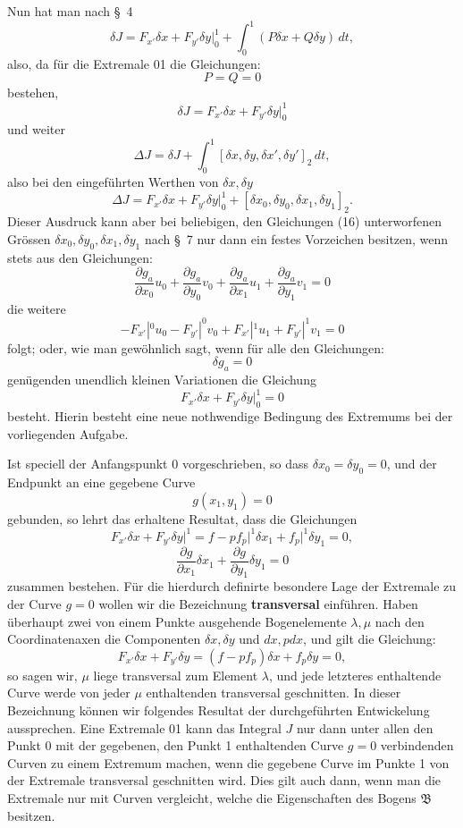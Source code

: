 \documentclass[11pt,a4paper,leqno]{article}
\begin{document}
Nun hat man nach \S~4
\[
\delta J=F_{x'}\delta x+F_{y'}\delta y\bigg|_0^1+\int_0^1(P\delta x+Q\delta y)\,dt,
\]
also, da für die Extremale 01 die Gleichungen:
\[
P=Q=0
\]
bestehen,
\[
\delta J=F_{x'}\delta x+F_{y'}\delta y\bigg|_0^1
\]
und weiter
\[
\Delta J=\delta J+\int_0^1[\delta x,\delta y,\delta x',\delta y']_2\,dt,
\]
also bei den eingeführten Werthen von $\delta x,\delta y$
\[
\Delta J=F_{x'}\delta x+F_{y'}\delta y\bigg|_0^1+[\delta x_0,\delta y_0,\delta x_1,\delta y_1]_2.
\]
Dieser Ausdruck kann aber bei beliebigen, den Gleichungen (16)
unterworfenen Grössen $\delta x_0,\delta y_0,\delta x_1,\delta y_1$ nach \S~7 nur dann ein festes Vorzeichen besitzen, wenn stets aus den Gleichungen:
\[
\frac{\partial g_a}{\partial x_0}u_0+\frac{\partial g_a}{\partial y_0}v_0+\frac{\partial g_a}{\partial x_1}u_1+\frac{\partial g_a}{\partial y_1}v_1=0
\]
die weitere
\[
-F_{x'}|^0u_0-F_{y'}|^0v_0+F_{x'}|^1u_1+F_{y'}|^1v_1=0
\]
folgt; oder, wie man gewöhnlich sagt, wenn für alle den Gleichungen:
\[
\delta g_a=0
\]
genügenden unendlich kleinen Variationen die Gleichung
\[
F_{x'}\delta x+F_{y'}\delta y\bigg|_0^1=0
\]
besteht. Hierin besteht eine neue nothwendige Bedingung des Extremums bei der vorliegenden Aufgabe.

Ist speciell der Anfangspunkt 0 vorgeschrieben, so dass $\delta x_0=\delta y_0=0$, und der Endpunkt an eine gegebene Curve
\[
g(x_1,y_1)=0
\]
gebunden, so lehrt das erhaltene Resultat, dass die Gleichungen
\[
F_{x'}\delta x+F_{y'}\delta y\bigg|^1=f-pf_p\big|^1\delta x_1+f_p\big|^1\delta y_1=0,
\]
\[
\frac{\partial g}{\partial x_1}\delta x_1+\frac{\partial g}{\partial y_1}\delta y_1=0
\]
zusammen bestehen. Für die hierdurch definirte besondere Lage der Extremale zu der Curve $g=0$ wollen wir die Bezeichnung \textbf{transversal} einführen. Haben überhaupt zwei von einem Punkte ausgehende Bogenelemente $\lambda,\mu$ nach den Coordinatenaxen die Componenten $\delta x,\delta y$ und $dx,pdx$, und gilt die Gleichung:
\[
F_{x'}\delta x+F_{y'}\delta y=(f-pf_p)\delta x+f_p\delta y=0,
\]
so sagen wir, $\mu$ liege transversal zum Element $\lambda$, und jede letzteres enthaltende Curve werde von jeder $\mu$ enthaltenden transversal geschnitten. In dieser Bezeichnung können wir folgendes Resultat der durchgeführten Entwickelung aussprechen. Eine Extremale 01 kann das Integral $J$ nur dann unter allen den Punkt 0 mit der gegebenen, den Punkt 1 enthaltenden Curve $g=0$ verbindenden Curven zu einem Extremum machen, wenn die gegebene Curve im Punkte 1 von der Extremale transversal geschnitten wird. Dies gilt auch dann, wenn man die Extremale nur mit Curven vergleicht, welche die Eigenschaften des Bogens $\mathfrak{B}$ besitzen.
\end{document}
